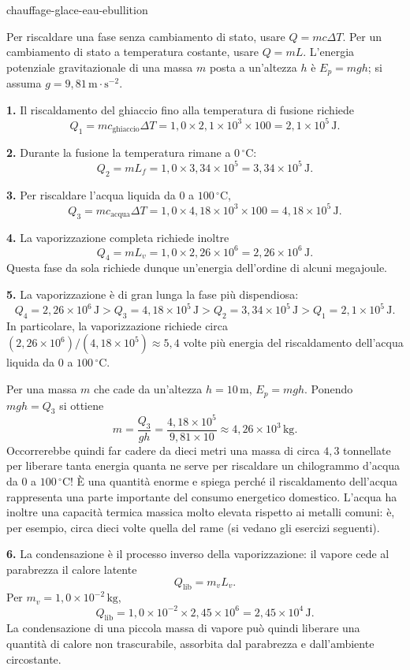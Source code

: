\begin{exo}{chauffage-glace-eau-ebullition}
\begin{indication}
Per riscaldare una fase senza cambiamento di stato, usare $Q=mc\Delta T$. Per un cambiamento di stato a temperatura costante, usare $Q=mL$. L'energia potenziale gravitazionale di una massa $m$ posta a un'altezza $h$ è $E_p=mgh$; si assuma $g=9{,}81\,\text{m}\!\cdot\!\text{s}^{-2}$.
\end{indication}

\begin{solution}
\textbf{1.} Il riscaldamento del ghiaccio fino alla temperatura di fusione richiede
\[
Q_1=mc_{\text{ghiaccio}}\Delta T
=1{,}0\times2{,}1\times10^3\times100
=2{,}1\times10^5\,\text{J}.
\]

\textbf{2.} Durante la fusione la temperatura rimane a $0\,{}^\circ\text{C}$:
\[
Q_2=mL_f=1{,}0\times3{,}34\times10^5
=3{,}34\times10^5\,\text{J}.
\]

\textbf{3.} Per riscaldare l'acqua liquida da $0$ a $100\,{}^\circ\text{C}$,
\[
Q_3=mc_{\text{acqua}}\Delta T
=1{,}0\times4{,}18\times10^3\times100
=4{,}18\times10^5\,\text{J}.
\]

\textbf{4.} La vaporizzazione completa richiede inoltre
\[
Q_4=mL_v=1{,}0\times2{,}26\times10^6
=2{,}26\times10^6\,\text{J}.
\]
Questa fase da sola richiede dunque un'energia dell'ordine di alcuni megajoule.

\textbf{5.} La vaporizzazione è di gran lunga la fase più dispendiosa:
\[
Q_4=2{,}26\times10^6\,\text{J}
>Q_3=4{,}18\times10^5\,\text{J}
>Q_2=3{,}34\times10^5\,\text{J}
>Q_1=2{,}1\times10^5\,\text{J}.
\]
In particolare, la vaporizzazione richiede circa $(2{,}26\times10^6)/(4{,}18\times10^5)\approx5{,}4$ volte più energia del riscaldamento dell'acqua liquida da $0$ a $100\,{}^\circ\text{C}$.

Per una massa $m$ che cade da un'altezza $h=10\,\text{m}$, $E_p=mgh$. Ponendo $mgh=Q_3$ si ottiene
\[
m=\frac{Q_3}{gh}
=\frac{4{,}18\times10^5}{9{,}81\times10}
\approx4{,}26\times10^3\,\text{kg}.
\]
Occorrerebbe quindi far cadere da dieci metri una massa di circa $4{,}3$ tonnellate per liberare tanta energia quanta ne serve per riscaldare un chilogrammo d'acqua da $0$ a $100\,{}^\circ\text{C}$! È una quantità enorme e spiega perché il riscaldamento dell'acqua rappresenta una parte importante del consumo energetico domestico. L'acqua ha inoltre una capacità termica massica molto elevata rispetto ai metalli comuni: è, per esempio, circa dieci volte quella del rame (si vedano gli esercizi seguenti).

\textbf{6.} La condensazione è il processo inverso della vaporizzazione: il vapore cede al parabrezza il calore latente
\[
Q_{\text{lib}}=m_vL_v.
\]
Per $m_v=1{,}0\times10^{-2}\,\text{kg}$,
\[
Q_{\text{lib}}=1{,}0\times10^{-2}\times2{,}45\times10^6
=2{,}45\times10^4\,\text{J}.
\]
La condensazione di una piccola massa di vapore può quindi liberare una quantità di calore non trascurabile, assorbita dal parabrezza e dall'ambiente circostante.
\end{solution}
\end{exo}

